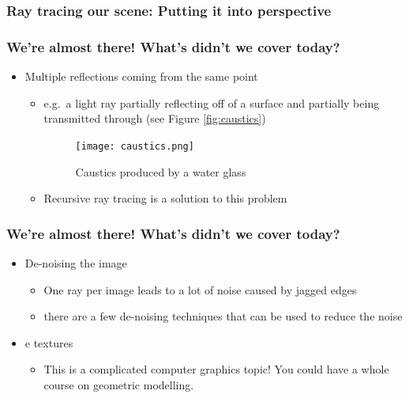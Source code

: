\documentclass[12pt]{beamer}
\begin{document}
  \begin{frame}
    \frametitle{Ray tracing our scene: Putting it into perspective}


  \end{frame}

  \begin{frame}
    \frametitle{We're almost there! What's didn't we cover today?}

    \begin{itemize}
      \item Multiple reflections coming from the same point
      \begin{itemize}
        \item e.g.\ a light ray partially reflecting off of a surface and partially being transmitted through (see Figure \autoref{fig:caustics})

        \begin{figure}
          \centering
          \texttt{[image: caustics.png]}
          \caption{Caustics produced by a water glass}
          \label{fig:caustics}
        \end{figure}

        \item Recursive ray tracing is a solution to this problem

      \end{itemize}

    \end{itemize}

  \end{frame}

  \begin{frame}
    \frametitle{We're almost there! What's didn't we cover today?}

    \begin{itemize}

      \item De-noising the image

      \begin{itemize}
        \item One ray per image leads to a lot of noise caused by jagged edges
        \item there are a few de-noising techniques that can be used to reduce the noise
      \end{itemize}

      \item e textures

      \begin{itemize}
        \item This is a complicated computer graphics topic!
        You could have a whole course on geometric modelling.
      \end{itemize}

    \end{itemize}

  \end{frame}
\end{document}
